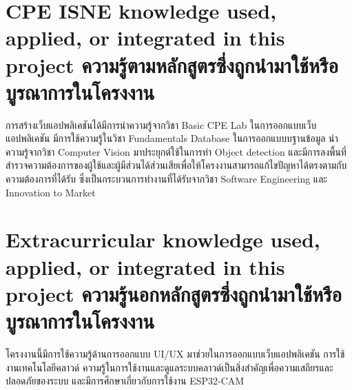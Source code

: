 \section{\ifenglish%
\ifcpe CPE \else ISNE \fi knowledge used, applied, or integrated in this project
\else%
ความรู้ตามหลักสูตรซึ่งถูกนำมาใช้หรือบูรณาการในโครงงาน
\fi
}
การสร้างเว็บแอปพลิเคชันได้มีการนำความรู้จากวิชา Basic CPE Lab ในการออกแบบเว็บแอปพลิเคชัน มีการใช้ความรู้ในวิชา Fundamentals Database
ในการออกแบบบฐานข้อมูล นำความรู้จากวิชา Computer Vision มาประยุกต์ใช้ในการทำ Object detection 
และมีการลงพื้นที่สำรวจความต้องการของผู้ใช้และผู้มีส่วนได้ส่วนเสียเพื่อให้โครงงานสามารถแก้ไขปัญหาได้ตรงตามกับความต้องการที่ได้รับ 
ซึ่งเป็นกระบวนการทำงานที่ได้รับจากวิชา Software Engineering และ Innovation to Market

\section{\ifenglish%
Extracurricular knowledge used, applied, or integrated in this project
\else%
ความรู้นอกหลักสูตรซึ่งถูกนำมาใช้หรือบูรณาการในโครงงาน
\fi
}
โครงงานนี้มีการใช้ความรู้ด้านการออกแบบ UI/UX มาช่วยในการออกแบบเว็บแอปพลิเคชัน การใช้งานเทคโนโลยีคลาวด์ ความรู้ในการใช้งานและดูแลระบบคลาวด์เป็นสิ่งสำคัญเพื่อความเสถียรและปลอดภัยของระบบ และมีการศึกษาเกี่ยวกับการใช้งาน ESP32-CAM 
